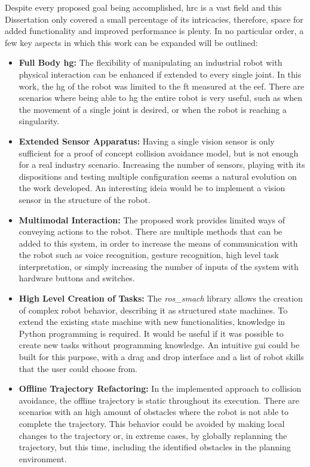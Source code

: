 \par Despite every proposed goal being accomplished, \ac{hrc} is a vast field and this Dissertation only covered a small percentage of its intricacies, therefore, space for added functionality and improved performance is plenty. In no particular order, a few key aspects in which this work can be expanded will be outlined:

\begin{itemize}
    \item \textbf{Full Body \ac{hg}: }The flexibility of manipulating an industrial robot with physical interaction can be enhanced if extended to every single joint. In this work, the \ac{hg} of the robot was limited to the \ac{ft} measured at the \ac{eef}. There are scenarios where being able to \ac{hg} the entire robot is very useful, such as when the movement of a single joint is desired, or when the robot is reaching a singularity.
    \item \textbf{Extended Sensor Apparatus: }Having a single vision sensor is only sufficient for a proof of concept collision avoidance model, but is not enough for a real industry scenario. Increasing the number of sensors, playing with its dispositions and testing multiple configuration seems a natural evolution on the work developed. An interesting ideia would be to implement a vision sensor in the structure of the robot.
    \item \textbf{Multimodal Interaction: }The proposed work provides limited ways of conveying actions to the robot. There are multiple methods that can be added to this system, in order to increase the means of communication with the robot such as voice recognition, gesture recognition, high level task interpretation, or simply increasing the number of inputs of the system with hardware buttons and switches.
    \item \textbf{High Level Creation of Tasks: }The \textit{ros\_smach} library allows the creation of complex robot behavior, describing it as structured state machines. To extend the existing state machine with new functionalities, knowledge in Python programming is required. It would be useful if it was possible to create new tasks without programming knowledge. An intuitive \ac{gui} could be built for this purpose, with a drag and drop interface and a list of robot skills that the user could choose from.
    \item \textbf{Offline Trajectory Refactoring: }In the implemented approach to collision avoidance, the offline trajectory is static throughout its execution. There are scenarios with an high amount of obstacles where the robot is not able to complete the trajectory. This behavior could be avoided by making local changes to the trajectory or, in extreme cases, by globally replanning the trajectory, but this time, including the identified obstacles in the planning environment.
\end{itemize}
